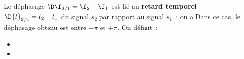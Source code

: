\documentclass[../../main/main.tex]{subfiles}
\begin{document}
\noindent
\begin{minipage}{0.65\linewidth}
	Le déphasage $\D\f_{2/1} = \f_2 - \f_1$ est lié au \textbf{retard temporel}
	$\D{t}_{2/1} = t_2 - t_1$ du signal $s_2$ par rapport au signal $s_1$~: on a
	\psw{
		\[\boxed{\D\f_{2/1} = -\w\D{t}_{2/1}}\]
	}
	Dans ce cas, le déphasage obtenu est entre $-\pi$ et $+\pi$. On définit~:
	\begin{itemize}
		\item {}
		\item {}
	\end{itemize}
\end{minipage}
\hfill
\begin{minipage}{0.30\linewidth}
	\vspace{-15pt}
	\begin{center}
	\end{center}
\end{minipage}
\end{document}
